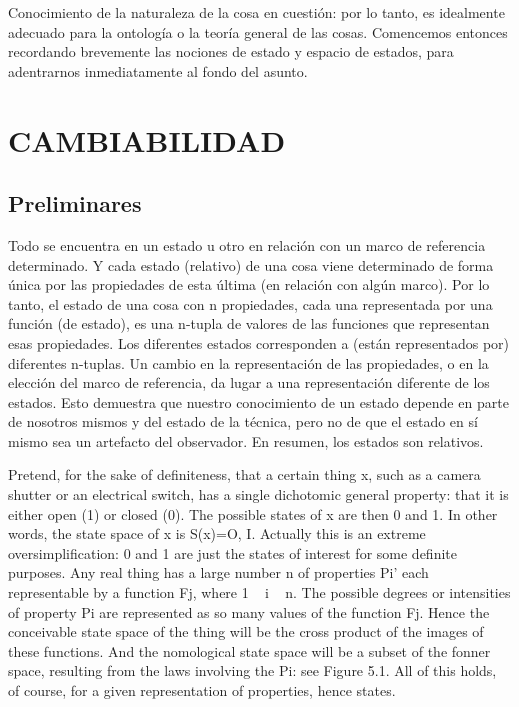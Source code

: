 \begin{justifying}
	\noindent Conocimiento de la naturaleza de la cosa en cuestión: por lo tanto,
	es idealmente adecuado para la ontología o la teoría general de las cosas.
	Comencemos entonces recordando brevemente las nociones de estado y espacio de estados,
	para adentrarnos inmediatamente al fondo del asunto.

	\section{\centering \large CAMBIABILIDAD}
	\subsection{Preliminares}
	\noindent Todo se encuentra en un estado u otro en relación con un marco de referencia determinado.
	Y cada estado (relativo) de una cosa viene determinado de forma única por las
	propiedades de esta última (en relación con algún marco). Por lo tanto, el estado de una cosa
	con n propiedades, cada una representada por una función (de estado), es una n-tupla de
	valores de las funciones que representan esas propiedades. Los diferentes estados
	corresponden a (están representados por) diferentes n-tuplas. Un cambio en la
	representación de las propiedades, o en la elección del marco de referencia, da lugar a
	una representación diferente de los estados. Esto demuestra que nuestro conocimiento de
	un estado depende en parte de nosotros mismos y del estado de la técnica, pero no
	de que el estado en sí mismo sea un artefacto del observador. En resumen, los estados
	son relativos.

	Pretend, for the sake of definiteness, that a certain thing x, such as a
	camera shutter or an electrical switch, has a single dichotomic general
	property: that it is either open (1) or closed (0). The possible states of x
	are then 0 and 1. In other words, the state space of x is S(x)={O, I}.
	Actually this is an extreme oversimplification: 0 and 1 are just the states
	of interest for some definite purposes. Any real thing has a large number
	n of properties Pi' each representable by a function Fj, where 1 ~ i ~ n.
	The possible degrees or intensities of property Pi are represented as so
	many values of the function Fj. Hence the conceivable state space of the
	thing will be the cross product of the images of these functions. And the
	nomological state space will be a subset of the fonner space, resulting
	from the laws involving the Pi: see Figure 5.1. All of this holds, of
	course, for a given representation of properties, hence states.



\end{justifying}
